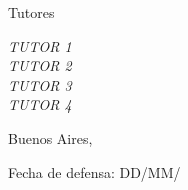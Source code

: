 \documentclass[../../main.tex]{subfiles}
\begin{document}
\begin{titlepage}
    \vfill
    {\Large{Tutores}\par}
    \begin{center}\slshape
    TUTOR 1\\[1ex]
    TUTOR 2\\[1ex]
    TUTOR 3\\[1ex]
    TUTOR 4\\[1ex]
    \end{center}
    \vskip 0.75cm
    {Buenos Aires, \the\year\par}
    \vskip 0.25cm
    {Fecha de defensa: DD/MM/\the\year}
\end{titlepage}
\end{document}
